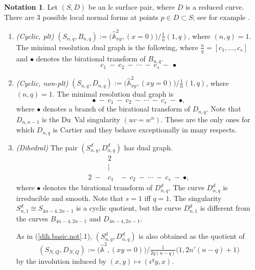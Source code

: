 \documentclass{amsart}
\theoremstyle{definition}
\newtheorem{notation}[thm]{Notation}
\theoremstyle{remark}
\renewcommand{\a}[0]{\hat{\mathbb A}}
\begin{document}
\begin{notation} \label{conormal.notation}
  Let  $(S, D)$ be an lc surface pair, where $D$ is a reduced curve.
 There are 3 possible local normal forms at points  $p\in D\subset S$; see for example \cite[Sec.3.3]{kk-singbook}. 
\begin{enumerate}
\item   {\it (Cyclic, plt)}
  $(S_{n,q}, B_{n,q}):=\bigl(\a^2_{xy}, (x=0)\bigr)/\tfrac1{n}(1,q)$, where $(n,q)=1$.  The minimal resolution dual graph is the following, where $\frac{n}{q}=[c_1,\dots, c_s]$ and $\bullet$ denotes the birational transform of $B_{n,q}$. 
  $$
  c_1  \ - \ c_2  \ - \ \cdots  \ - \  c_s \ - \ \bullet
     $$
\item
   {\it (Cyclic, non-plt)}
   $(S_{n,q}, D_{n,q}):=\bigl(\a^2_{xy}, (xy=0)\bigr)/\tfrac1{n}(1,q)$, where $(n,q)=1$.
     The minimal resolution dual graph is
   $$
  \bullet \ - \  c_1  \ - \ c_2  \ - \ \cdots  \ - \  c_s \ - \ \bullet,
  $$
  where $\bullet$ denotes a branch of the birational transform of $D_{n,q}$.
  Note that $D_{n,n{-}1}$ is the Du~Val singularity  $(uv=w^n)$. These are the only ones for which $D_{n,q}$ is Cartier and they behave exceptionally in many respects.
\item
  {\it (Dihedral)}  The pair  $(S^d_{n,q}, D^d_{n,q})$ has dual graph.
  $$
  \begin{array}{ccc}
    & 2 &\\
     & | &\\
    2  \ - \!\!\!\!   &c_1& \!\!\!\!   - \ c_2  \ - \ \cdots  \ - \  c_s  \ - \ \bullet,
  \end{array}
  $$
 where  $\bullet$ denotes the birational transform of $D^d_{n,q}$.
  The curve $D^d_{n,q}$ is irreducible and smooth.
  Note that $s=1$ iff $q=1$. The singularity $S^d_{n,1}\cong S_{4n-4, 2n-1}$ is a cyclic quotient, but the curve $D^d_{n,1}$ is different from the curves
  $B_{4n-4, 2n-1}$ and $D_{4n-4, 2n-1}$.
  

  
As in (\ref{dih.basic.not}.1), $(S^d_{n,q},D^d_{n,q})$  is also obtained as the quotient of
$$
(S_{N,Q}, D_{N,Q}):=\bigl(\a^2, (xy=0)\bigr)/\tfrac1{2q(n-q)}\bigl(1, 2n'(n-q)+1\bigr)
$$
by the  involution  induced by  $(x, y)\mapsto (\epsilon^q y, x)$.
 \end{enumerate}
\end{notation}
\end{document}
